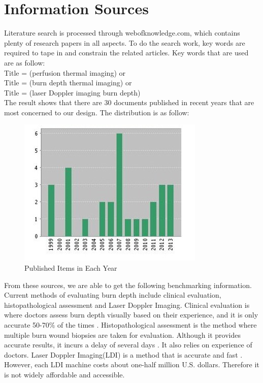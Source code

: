 \documentclass[paper=letter, fontsize=11pt]{scrartcl}
\numberwithin{equation}{section}		%
\numberwithin{figure}{section}			%
\numberwithin{table}{section}			%
\begin{document}
\section{Information Sources}
Literature search is processed through webofknowledge.com, which contains plenty of research papers in all aspects. To do the
search work, key words are required to tape in and constrain the related articles. Key words that are used are as follow:
\\Title = (perfusion thermal imaging) or 
\\Title = (burn depth thermal imaging) or
\\Title = (laser Doppler imaging burn depth)
\\The result shows that there are 30 documents published in recent years that are most concerned to our design. 
The distribution is as follow:

\begin{figure}[H]
    \centering
    \includegraphics[scale=1]{PIEY}
	\caption{Published Items in Each Year}
\end{figure}

From these sources, we are able to get the following benchmarking information. Current methods of evaluating burn depth
include clinical evaluation, histopathological assessment and Laser Doppler Imaging. Clinical evaluation is where doctors
assess burn depth visually based on their experience, and it is only accurate 50-70\% of the times \cite{Renkielska}.
Histopathological assessment is the method where multiple burn wound biopsies are taken for evaluation. Although it provides
accurate results, it incurs a delay of several days \cite{Renkielska}. It also relies on experience of doctors. Laser Doppler Imaging(LDI) 
is a method that is accurate and fast \cite{Pape}. However, each LDI machine costs about one-half million U.S. dollars.
Therefore it is not widely affordable and accessible.
\end{document}
